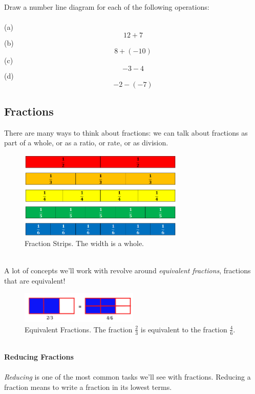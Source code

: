 \begin{exercise}
	Draw a number line diagram for each of the following operations:   \\ \\
(a)	\[  12 + 7  \]    
(b)	\[  8 + (-10) \]  
(c)	\[  -3 - 4  \]
(d)	\[  -2 - (-7)    \]

\end{exercise}


\newpage 
\subsection{Fractions}
There are many ways to think about fractions: we can talk about fractions as part of a whole, or as a ratio, or rate, or as division.  
\begin{figure}[h!]
    \centering
    \includegraphics[width=0.7\textwidth]{img/FractionStrips.png}  
    \caption{Fraction Strips. The width is a whole.}
    \label{fig:fraction-strips}
\end{figure}
\\
A lot of concepts we'll work with revolve around \emph{equivalent fractions}, fractions that are equivalent!
\begin{figure}[h!]
    \centering
    \includegraphics[width=0.5\textwidth]{img/fraction2-3.png}
    \caption{Equivalent Fractions.  The fraction \(\frac{2}{3}\) is equivalent to the fraction \(\frac{4}{6}\).}
    \label{fig:equivalent-fractions}
\end{figure}
\\ 
\textbf{Reducing Fractions}
\\ \\ 
\emph{Reducing} is one of the most common tasks we'll see with fractions.  Reducing a fraction means to write a fraction in its lowest terms.  





